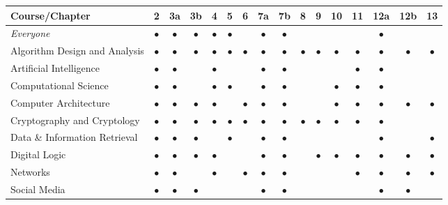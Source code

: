 \noindent
\begin{tabular}{|l||c|c|c|c|c|c|c|c|c|c|c|c|c|c|c|}
\hline
{\bf Course}/{\bf Chapter}
   & 2 & 3a & 3b & 4 & 5 & 6 & 7a & 7b & 8 & 9 & 10 & 11 & 12a & 12b & 13 \\
\hline
\hline
{\em Everyone} 
   & $\bullet$ & $\bullet$ & $\bullet$ & $\bullet$ & $\bullet$ &  & $\bullet$ & $\bullet$ &  &  &  &  & $\bullet$ & &  \\
\hline
Algorithm Design and Analysis
   & $\bullet$ & $\bullet$ & $\bullet$ & $\bullet$ & $\bullet$ & $\bullet$ & $\bullet$ & $\bullet$ & $\bullet$ & $\bullet$ & $\bullet$ & $\bullet$ & $\bullet$ & $\bullet$ & $\bullet$ \\
   \hline
Artificial Intelligence
   & $\bullet$ & $\bullet$ & & $\bullet$ &  &  & $\bullet$ & $\bullet$ &  &  &  & $\bullet$ & $\bullet$ & &  \\
   \hline
Computational Science
   & $\bullet$ & $\bullet$ & & $\bullet$ & $\bullet$ &  & $\bullet$ & $\bullet$ &  &  & $\bullet$ & $\bullet$ & $\bullet$ &  &  \\
\hline
Computer Architecture 
   & $\bullet$ & $\bullet$ & $\bullet$ & $\bullet$ &  & $\bullet$ & $\bullet$ & $\bullet$ &  &  & $\bullet$ & $\bullet$ & $\bullet$ & $\bullet$ & $\bullet$ \\
\hline
Cryptography and Cryptology 
   & $\bullet$ & $\bullet$ & $\bullet$ & $\bullet$ & $\bullet$ & $\bullet$ & $\bullet$ & $\bullet$ & $\bullet$ & $\bullet$ & $\bullet$ & $\bullet$ & $\bullet$ & &  \\
\hline
Data \& Information Retrieval
   & $\bullet$ & $\bullet$ & $\bullet$ & & $\bullet$ &  & $\bullet$ & $\bullet$ &  &  &  &  & $\bullet$ & & $\bullet$ \\
\hline
Digital Logic 
   & $\bullet$ & $\bullet$ & $\bullet$ & $\bullet$ &  &  & $\bullet$ & $\bullet$ &  & $\bullet$ & $\bullet$ & $\bullet$ & $\bullet$ & $\bullet$ & $\bullet$ \\
\hline
Networks
   & $\bullet$ & $\bullet$ & & $\bullet$ &  & $\bullet$ & $\bullet$ & $\bullet$ &  &  &  & $\bullet$ & $\bullet$ & $\bullet$ & $\bullet$ \\
\hline
Social Media 
   & $\bullet$ & $\bullet$ & $\bullet$ &  &  &  & $\bullet$ & $\bullet$ &  &  &  &  & $\bullet$ & $\bullet$ &  \\

\end{tabular}
